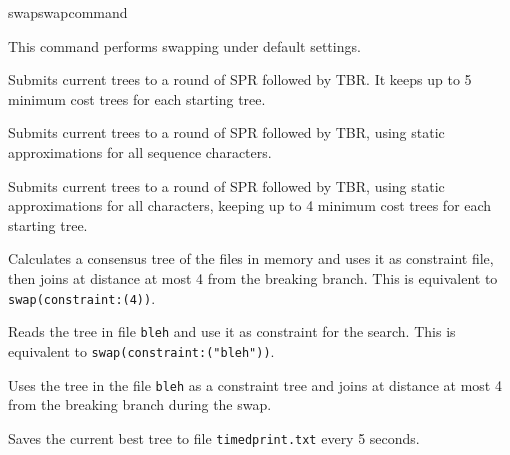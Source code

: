 \begin{command}{swap}{swapcommand}
\begin{arguments}
	\end{arguments}


	\begin{poyexamples} 
            {This command performs swapping under default settings.}

            {Submits current trees to a round of SPR followed by TBR. It keeps
            up to 5 minimum cost trees for each starting tree.}

            {Submits current trees to a round of SPR followed by TBR, using
            static approximations for all sequence characters.}
            
            {Submits current trees to a round of SPR followed by TBR, using
            static approximations for all characters, keeping up to 4 minimum
            cost trees for each starting tree.}
            
            {Calculates a consensus tree of the files in memory and uses it as
            constraint file, then joins at distance at most 4 from the breaking
            branch. This is equivalent to \texttt{swap(constraint:(4))}.}
	
            {Reads the tree in file \texttt{bleh} and use it as constraint for the
            search. This is equivalent to \texttt{swap(constraint:("bleh"))}.}	
		
            {Uses the tree in the file \texttt{bleh} as a constraint tree and joins at
            distance at most 4 from the breaking branch during the swap.}
        
            {Saves the current best tree to file \texttt{timedprint.txt} every 5 seconds.}
            
	\end{poyexamples}

	\begin{poyalso}
	\end{poyalso} 

\end{command}

